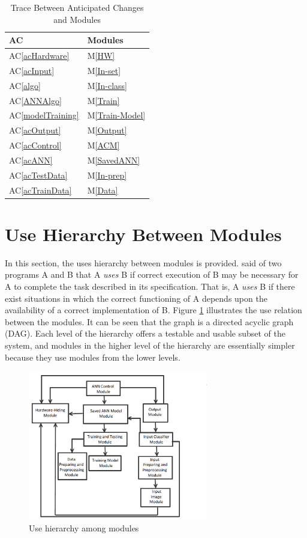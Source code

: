 \documentclass[12pt, titlepage]{article}
\newcommand{\acref}[1]{AC\ref{#1}}
\newcommand{\mref}[1]{M\ref{#1}}
\begin{document}
\begin{table}[H]
\centering
\begin{tabular}{p{} p{}}
\toprule
\textbf{AC} & \textbf{Modules}\\
\midrule
\acref{acHardware} & \mref{HW}\\
\acref{acInput} & \mref{In-set}\\
\acref{algo} & \mref{In-class}\\
\acref{ANNAlgo} & \mref{Train}\\
\acref{modelTraining} & \mref{Train-Model}\\
\acref{acOutput} & \mref{Output}\\
\acref{acControl} & \mref{ACM} \\
\acref{acANN} & \mref{SavedANN}\\
\acref{acTestData} & \mref{In-prep}\\
\acref{acTrainData} & \mref{Data}\\
\bottomrule
\end{tabular}
\caption{Trace Between Anticipated Changes and Modules}
\label{TblACT}
\end{table}

\section{Use Hierarchy Between Modules} \label{SecUse}

In this section, the uses hierarchy between modules is
provided. \citet{Parnas1978} said of two programs A and B that A {\em uses} B if
correct execution of B may be necessary for A to complete the task described in
its specification. That is, A {\em uses} B if there exist situations in which
the correct functioning of A depends upon the availability of a correct
implementation of B.  Figure \ref{FigUH} illustrates the use relation between
the modules. It can be seen that the graph is a directed acyclic graph
(DAG). Each level of the hierarchy offers a testable and usable subset of the
system, and modules in the higher level of the hierarchy are essentially simpler
because they use modules from the lower levels.

\begin{figure}[H]
\centering
\includegraphics[width=0.7\textwidth]{Modules.PNG}
\caption{Use hierarchy among modules}
\label{FigUH}
\end{figure}
\end{document}
